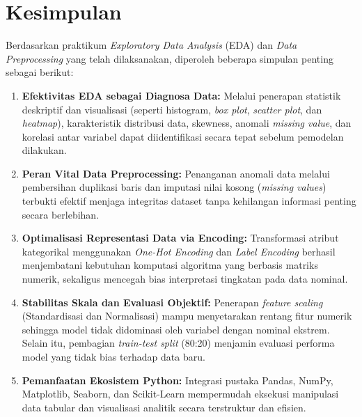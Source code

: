 \documentclass[a4paper,oneside,11pt]{book}
\begin{document}
\chapter{Kesimpulan}
\label{chap:kesimpulan}
Berdasarkan praktikum \textit{Exploratory Data Analysis} (EDA) dan \textit{Data Preprocessing} yang telah dilaksanakan, diperoleh beberapa simpulan penting sebagai berikut:
\begin{enumerate}
    \item \textbf{Efektivitas EDA sebagai Diagnosa Data:} Melalui penerapan statistik deskriptif dan visualisasi (seperti histogram, \textit{box plot}, \textit{scatter plot}, dan \textit{heatmap}), karakteristik distribusi data, skewness, anomali \textit{missing value}, dan korelasi antar variabel dapat diidentifikasi secara tepat sebelum pemodelan dilakukan.
    
    \item \textbf{Peran Vital Data Preprocessing:} Penanganan anomali data melalui pembersihan duplikasi baris dan imputasi nilai kosong (\textit{missing values}) terbukti efektif menjaga integritas dataset tanpa kehilangan informasi penting secara berlebihan.
    
    \item \textbf{Optimalisasi Representasi Data via Encoding:} Transformasi atribut kategorikal menggunakan \textit{One-Hot Encoding} dan \textit{Label Encoding} berhasil menjembatani kebutuhan komputasi algoritma yang berbasis matriks numerik, sekaligus mencegah bias interpretasi tingkatan pada data nominal.
    
    \item \textbf{Stabilitas Skala dan Evaluasi Objektif:} Penerapan \textit{feature scaling} (Standardisasi dan Normalisasi) mampu menyetarakan rentang fitur numerik sehingga model tidak didominasi oleh variabel dengan nominal ekstrem. Selain itu, pembagian \textit{train-test split} (80:20) menjamin evaluasi performa model yang tidak bias terhadap data baru.
    
    \item \textbf{Pemanfaatan Ekosistem Python:} Integrasi pustaka Pandas, NumPy, Matplotlib, Seaborn, dan Scikit-Learn mempermudah eksekusi manipulasi data tabular dan visualisasi analitik secara terstruktur dan efisien.
\end{enumerate}
\end{document}
